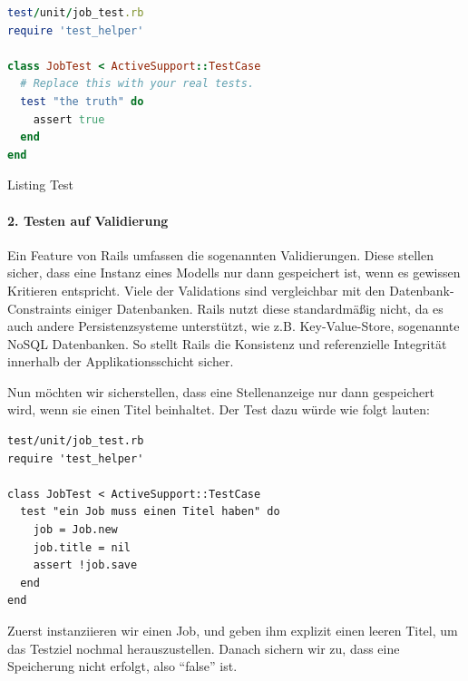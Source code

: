 \begin{lstlisting}[language=ruby]
test/unit/job_test.rb 
require 'test_helper'

class JobTest < ActiveSupport::TestCase
  # Replace this with your real tests.
  test "the truth" do
    assert true
  end
end
\end{lstlisting}

\begin{ruby}[label={test/units/job\_test.rb}]
 

   
    
     
\end{ruby}
\label{list:bla}
\captionsetup{type=lstlisting}
\caption{Listing Test}


\paragraph{2. Testen auf Validierung}

Ein Feature von Rails umfassen die sogenannten Validierungen. Diese stellen sicher, dass eine Instanz eines Modells nur dann gespeichert ist, wenn es gewissen Kritieren entspricht. Viele der Validations sind vergleichbar mit den Datenbank-Constraints einiger Datenbanken. Rails nutzt diese standardmäßig nicht, da es auch andere Persistenzsysteme unterstützt, wie z.B. Key-Value-Store, sogenannte NoSQL Datenbanken. So stellt Rails die Konsistenz und referenzielle Integrität innerhalb der Applikationsschicht sicher.

Nun möchten wir sicherstellen, dass eine Stellenanzeige nur dann gespeichert wird, wenn sie einen Titel beinhaltet. Der Test dazu würde wie folgt lauten:

\begin{lstlisting}
test/unit/job_test.rb 
require 'test_helper'

class JobTest < ActiveSupport::TestCase
  test "ein Job muss einen Titel haben" do
    job = Job.new
    job.title = nil
    assert !job.save
  end
end
\end{lstlisting}
\tddred
Zuerst instanziieren wir einen Job, und geben ihm explizit einen leeren Titel, um das Testziel nochmal herauszustellen. Danach sichern wir zu, dass eine Speicherung nicht erfolgt, also "`false"' ist.

